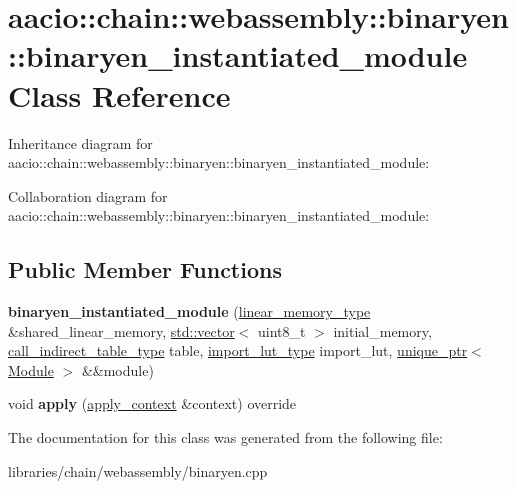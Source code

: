 \hypertarget{classaacio_1_1chain_1_1webassembly_1_1binaryen_1_1binaryen__instantiated__module}{}\section{aacio\+:\+:chain\+:\+:webassembly\+:\+:binaryen\+:\+:binaryen\+\_\+instantiated\+\_\+module Class Reference}
\label{classaacio_1_1chain_1_1webassembly_1_1binaryen_1_1binaryen__instantiated__module}


Inheritance diagram for aacio\+:\+:chain\+:\+:webassembly\+:\+:binaryen\+:\+:binaryen\+\_\+instantiated\+\_\+module\+:


Collaboration diagram for aacio\+:\+:chain\+:\+:webassembly\+:\+:binaryen\+:\+:binaryen\+\_\+instantiated\+\_\+module\+:
\subsection*{Public Member Functions}
\begin{DoxyCompactItemize}
\item 
\mbox{\label{classaacio_1_1chain_1_1webassembly_1_1binaryen_1_1binaryen__instantiated__module_a95d5e1a7630064916a0f8de1b0f6c497}} 
{\bfseries binaryen\+\_\+instantiated\+\_\+module} (\mbox{\hyperlink{classfc_1_1array}{linear\+\_\+memory\+\_\+type}} \&shared\+\_\+linear\+\_\+memory, \mbox{\hyperlink{classstd_1_1vector}{std\+::vector}}$<$ uint8\+\_\+t $>$ initial\+\_\+memory, \mbox{\hyperlink{classstd_1_1vector}{call\+\_\+indirect\+\_\+table\+\_\+type}} table, \mbox{\hyperlink{classstd_1_1unordered__map}{import\+\_\+lut\+\_\+type}} import\+\_\+lut, \mbox{\hyperlink{classfc_1_1unique__ptr}{unique\+\_\+ptr}}$<$ \mbox{\hyperlink{classwasm_1_1_module}{Module}} $>$ \&\&module)
\item 
\mbox{\label{classaacio_1_1chain_1_1webassembly_1_1binaryen_1_1binaryen__instantiated__module_a6fc777ada454f945795fab0111196d99}} 
void {\bfseries apply} (\mbox{\hyperlink{classaacio_1_1chain_1_1apply__context}{apply\+\_\+context}} \&context) override
\end{DoxyCompactItemize}


The documentation for this class was generated from the following file\+:\begin{DoxyCompactItemize}
\item 
libraries/chain/webassembly/binaryen.\+cpp\end{DoxyCompactItemize}
